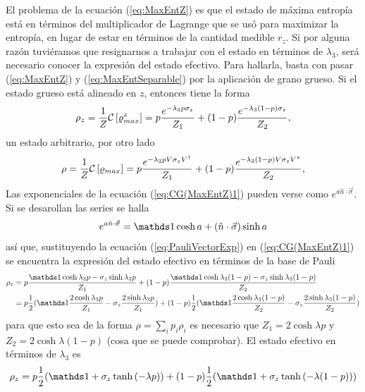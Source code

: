 El problema de la ecuación (\ref{eq:MaxEntZ}) es que el estado de máxima entropía está en términos del multiplicador de Lagrange que se usó para maximizar la entropía, en lugar de estar en términos de la cantidad medible $r_{z}$. Si por alguna razón tuviéramos que resignarnos a trabajar con el estado en términos de $\lambda_{3}$, será necesario conocer la expresión del estado efectivo. Para hallarla, basta con pasar (\ref{eq:MaxEntZ}) y (\ref{eq:MaxEntSeparable}) por la aplicación de grano grueso. Si el estado grueso está alineado en $z$, entonces tiene la forma
\begin{equation}\label{eq:CG(MaxEntZ)1}
    \rho_{z}=\frac{1}{Z}\mathcal{C}\left[\varrho_{max}^{z}\right]=p\frac{e^{-\lambda_{3}p\sigma_{z}}}{Z_{1}}+(1-p)\frac{e^{-\lambda_{3}(1-p)\sigma_{z}}}{Z_{2}},
\end{equation}
un estado arbitrario, por otro lado
\begin{equation}\label{eq:CG(MaxEnt)1}
  \rho=\frac{1}{Z}\mathcal{C}\left[\varrho_{max}\right]=p\frac{e^{-\lambda_{3}pV\sigma_{z}V^{\dag}}}{Z_{1}}+(1-p)\frac{e^{-\lambda_{3}(1-p)V\sigma_{z}V^{z}}}{Z_{2}},
\end{equation}
Las exponenciales de la ecuación (\ref{eq:CG(MaxEntZ)1}) pueden verse como $e^{a\hat{n}\cdot \vec{\sigma}}$. Si se desarollan las series se halla
\begin{equation}\label{eq:PauliVectorExp}
    e^{a\hat{n}\cdot \vec{\sigma}}=\Id \cosh{a}+(\hat{n}\cdot \vec{\sigma})\sinh{a}
\end{equation}
así que, sustituyendo la ecuación (\ref{eq:PauliVectorExp}) en (\ref{eq:CG(MaxEntZ)1}) se encuentra la expresión del estado efectivo en términos de la base de Pauli
\begin{align*}
    \rho_{z}&=p\frac{\Id \cosh{\lambda_{3}p}-\sigma_{z}\sinh{\lambda_{3}p}}{Z_{1}}+(1-p)\frac{\Id \cosh{\lambda_{3}(1-p)}-\sigma_{z}\sinh{\lambda_{3}(1-p)}}{Z_{2}}\\
    &=p\frac{1}{2}(\Id \frac{2\cosh{\lambda_{3}p}}{Z_{1}}-\sigma_{z}\frac{2\sinh{\lambda_{3}p}}{Z_{1}})+(1-p)\frac{1}{2}(\Id \frac{2\cosh{\lambda_{3}(1-p)}}{Z_{2}}-\sigma_{z}\frac{2\sinh{\lambda_{3}(1-p)}}{Z_{2}})
\end{align*}
para que esto sea de la forma $\rho=\sum_{i}p_{i}\rho_{i}$ es necesario que $Z_{1}=2\cosh{\lambda p}$ y $Z_{2}=2\cosh{\lambda (1-p)}$ (cosa que se puede comprobar). El estado efectivo en términos de $\lambda_{3}$ es
\begin{equation}\label{eq:CG(MaxEntZ)2}
    \rho_{z}=p\frac{1}{2}(\Id+\sigma_{z}\tanh{(-\lambda p)})+(1-p)\frac{1}{2}(\Id+\sigma_{z}\tanh{(-\lambda (1-p))})
\end{equation}
